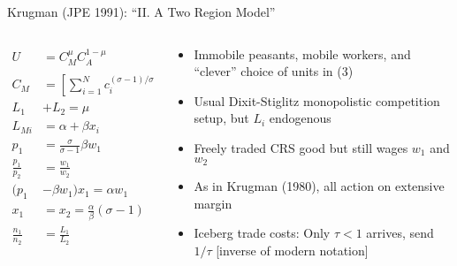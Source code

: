 \documentclass[11pt,notes=hide,aspectratio=169]{beamer}
\begin{document}
\begin{frame}{Krugman (JPE 1991): ``II. A Two Region Model''}
\begin{columns}
\begin{column}{.5\textwidth}
\begin{small}
\begin{align*}
U 
&=
C_M^{\mu}C_A^{1-\mu}
&
\text{(1)}
\\
C_M 
&=
\left[\sum_{i=1}^{N} c_i^{(\sigma-1)/\sigma}\right]^{\sigma/(\sigma-1)}
&
\text{(2)}
\\
L_1 &+ L_2 
=
\mu
&
\text{(3)}
\\
L_{Mi} 
&= 
\alpha + \beta x_i
&
\text{(4)}
\\
p_1 
&=
\frac{\sigma}{\sigma-1} \beta w_1
&
\text{(5)}
\\
\frac{p_1}{p_2}
&=
\frac{w_1}{w_2}  
&
\text{(6)}
\\
(p_1 &- \beta w_1) x_1 
=
\alpha w_1
&
\text{(7)}
\\
x_1 &= x_2 = \frac{\alpha}{\beta} (\sigma-1)
&
\text{(8)}
\\
\frac{n_1}{n_2} &= \frac{L_1}{L_2}
&
\text{(9)}
\end{align*}
\end{small}
\end{column}
\begin{column}{.48\textwidth}{\small
\begin{itemize}
	\item Immobile peasants, mobile workers, and ``clever'' choice of units in (3)
	\item Usual Dixit-Stiglitz monopolistic competition setup, but $L_i$ endogenous
	\item Freely traded CRS good but still wages $w_1$ and $w_2$
	\item As in Krugman (1980), all action on extensive margin
	\item Iceberg trade costs: Only $\tau<1$ arrives, send $1/\tau$ [inverse of modern notation]
\end{itemize}
}\end{column}
\end{columns}
\end{frame}
\end{document}
